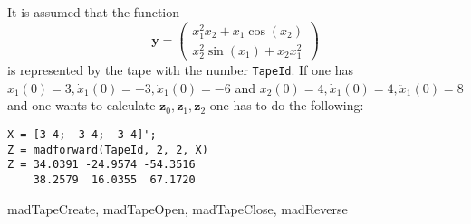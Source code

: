 \begin{Examples}
It is assumed that the function
\begin{equation*}
\mathbf{y} = 
\begin{pmatrix}
x_1^2x_2 + x_1\cos(x_2)\\
x_2^2\sin(x_1) + x_2x_1^2
\end{pmatrix}
\end{equation*}
is represented by the tape with the number \texttt{TapeId}. If one has $x_1(0) = 3, \dot x_1(0) = -3, \ddot x_1(0) = -6$ and $x_2(0) = 4, \dot x_1(0) = 4, \ddot x_1(0) = 8$ and one wants to calculate $\mathbf{z}_0, \mathbf{z}_1, \mathbf{z}_2$ one has to do the following:
\begin{verbatim}
X = [3 4; -3 4; -3 4]';
Z = madforward(TapeId, 2, 2, X)
Z = 34.0391 -24.9574 -54.3516
    38.2579  16.0355  67.1720
\end{verbatim}
\end{Examples}




\begin{Seealso}
madTapeCreate, madTapeOpen, madTapeClose, madReverse
\end{Seealso}




